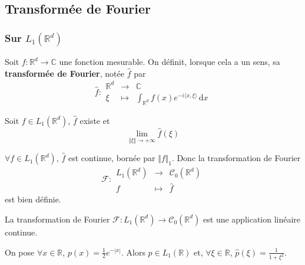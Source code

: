   \subsection{Transformée de Fourier}

  \subsubsection{Sur \texorpdfstring{$L_1(\mathbb{R}^d)$}{Rᵈ}}


  \begin{definition}
    Soit $f : \mathbb{R}^d \rightarrow \mathbb{C}$ une fonction mesurable. On définit, lorsque cela a un sens, sa \textbf{transformée de Fourier}, notée $\widehat{f}$ par
    \[
    \widehat{f} :
    \begin{array}{ccc}
      \mathbb{R}^d &\rightarrow& \mathbb{C} \\
      \xi &\mapsto& \int_{\mathbb{R}^d} f(x) e^{-i\langle x, \xi \rangle} \, \mathrm{d}x
    \end{array}
    \]
  \end{definition}

  \begin{lemma}
    Soit $f \in L_1(\mathbb{R}^d)$, $\widehat{f}$ existe et
    \[ \lim_{\Vert \xi \Vert \rightarrow +\infty} \widehat{f}(\xi) \]
  \end{lemma}

  \begin{theorem}
    $\forall f \in L_1(\mathbb{R}^d)$, $\widehat{f}$ est continue, bornée par $\Vert f \Vert_1$. Donc la transformation de Fourier
    \[
    \mathcal{F} :
    \begin{array}{ccc}
      L_1(\mathbb{R}^d) &\rightarrow& \mathcal{C}_0(\mathbb{R}^d) \\
      f &\mapsto& \widehat{f}
    \end{array}
    \]
    est bien définie.
  \end{theorem}

  \begin{corollary}
    La transformation de Fourier $\mathcal{F} : L_1(\mathbb{R}^d) \rightarrow \mathcal{C}_0(\mathbb{R}^d)$ est une application linéaire continue.
  \end{corollary}

  \begin{example}
    On pose $\forall x \in \mathbb{R}$, $p(x) = \frac{1}{2} e^{-|x|}$. Alors $p \in L_1(\mathbb{R})$ et, $\forall \xi \in \mathbb{R}$, $\widehat{p}(\xi) = \frac{1}{1+\xi^2}$.
  \end{example}

